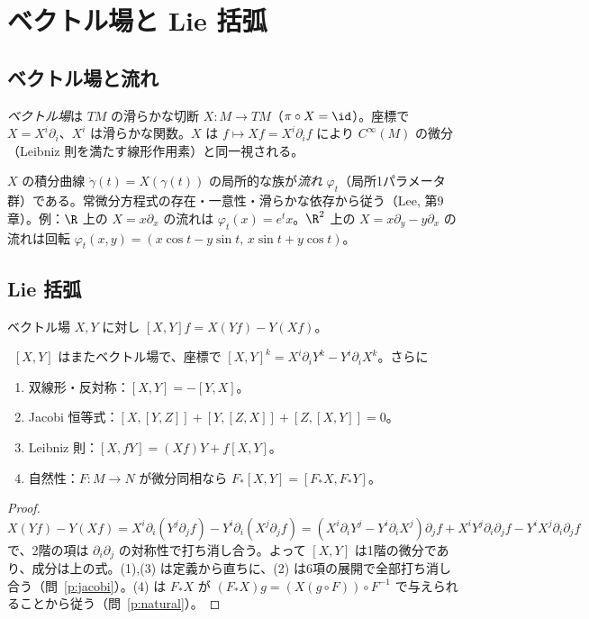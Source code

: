 
\section{ベクトル場と Lie 括弧}
\subsection{ベクトル場と流れ}
\begin{defn}
\emph{ベクトル場}は $TM$ の滑らかな切断 $X:M\to TM$（$\pi\circ X=\id$）。座標で $X=X^i\partial_i$、$X^i$ は滑らかな関数。$X$ は $f\mapsto Xf=X^i\partial_if$ により $C^\infty(M)$ の微分（Leibniz 則を満たす線形作用素）と同一視される。
\end{defn}

$X$ の積分曲線 $\dot\gamma(t)=X(\gamma(t))$ の局所的な族が\emph{流れ} $\varphi_t$（局所1パラメータ群）である。常微分方程式の存在・一意性・滑らかな依存から従う\tC（Lee, 第9章）。例：$\R$ 上の $X=x\partial_x$ の流れは $\varphi_t(x)=e^tx$。$\R^2$ 上の $X=x\partial_y-y\partial_x$ の流れは回転 $\varphi_t(x,y)=(x\cos t-y\sin t,\,x\sin t+y\cos t)$。

\subsection{Lie 括弧}
\begin{defn}[Lie 括弧]
ベクトル場 $X,Y$ に対し $[X,Y]f=X(Yf)-Y(Xf)$。
\end{defn}

\begin{prop}\label{prop:bracket}
\tP\ $[X,Y]$ はまたベクトル場で、座標で $[X,Y]^k=X^i\partial_iY^k-Y^i\partial_iX^k$。さらに
\begin{enumerate}
\item 双線形・反対称：$[X,Y]=-[Y,X]$。
\item Jacobi 恒等式：$[X,[Y,Z]]+[Y,[Z,X]]+[Z,[X,Y]]=0$。
\item Leibniz 則：$[X,fY]=(Xf)Y+f[X,Y]$。
\item 自然性：$F:M\to N$ が微分同相なら $F_*[X,Y]=[F_*X,F_*Y]$。
\end{enumerate}
\end{prop}
\begin{proof}
$X(Yf)-Y(Xf)=X^i\partial_i(Y^j\partial_jf)-Y^i\partial_i(X^j\partial_jf)=(X^i\partial_iY^j-Y^i\partial_iX^j)\partial_jf+X^iY^j\partial_i\partial_jf-Y^iX^j\partial_i\partial_jf$ で、2階の項は $\partial_i\partial_j$ の対称性で打ち消し合う。よって $[X,Y]$ は1階の微分であり、成分は上の式。(1),(3) は定義から直ちに、(2) は6項の展開で全部打ち消し合う（問~\ref{p:jacobi}）。(4) は $F_*X$ が $(F_*X)g=(X(g\circ F))\circ F^{-1}$ で与えられることから従う（問~\ref{p:natural}）。
\end{proof}

